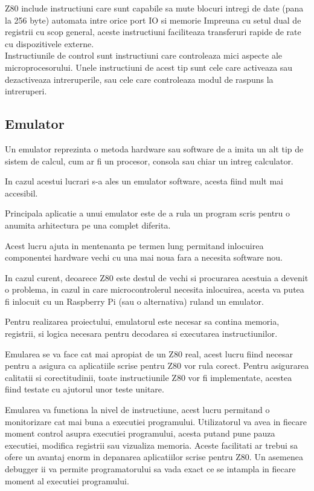 \documentclass[titlepage,12pt]{article}
\begin{document}
\ac {Z80} include instructiuni care sunt capabile sa mute blocuri intregi de date (pana la 256 byte) automata intre orice port \ac {IO} si memorie
Impreuna cu setul dual de registrii cu scop general, aceste instructiuni faciliteaza transferuri rapide de rate cu dispozitivele externe.\\

Instructiunile de control sunt instructiuni care controleaza mici aspecte ale microprocesorului.
Unele instructiuni de acest tip sunt cele care activeaza sau dezactiveaza intreruperile, sau cele care controleaza modul de raspuns la intreruperi.

\subsection{Emulator}
Un emulator reprezinta o metoda hardware sau software de a imita un alt tip de sistem de calcul, cum ar fi un procesor, consola sau chiar un intreg calculator.

In cazul acestui lucrari s-a ales un emulator software, acesta fiind mult mai accesibil.

Principala aplicatie a unui emulator este de a rula un program scris pentru o anumita arhitectura pe una complet diferita.

Acest lucru ajuta in mentenanta pe termen lung permitand inlocuirea componentei hardware vechi cu una mai noua fara a necesita software nou.

In cazul curent, deoarece \ac {Z80} este destul de vechi si procurarea acestuia a devenit o problema, in cazul in care microcontrolerul necesita inlocuirea, acesta va putea fi inlocuit cu un Raspberry Pi (sau o alternativa) ruland un emulator.

Pentru realizarea proiectului, emulatorul este necesar sa contina memoria, registrii, si logica necesara pentru decodarea si executarea instructiunilor.

Emularea se va face cat mai apropiat de un Z80 real, acest lucru fiind necesar pentru a asigura ca aplicatiile scrise pentru Z80 vor rula corect.
Pentru asigurarea calitatii si corectitudinii, toate instructiunile Z80 vor fi implementate, acestea fiind testate cu ajutorul unor teste unitare.

Emularea va functiona la nivel de instructiune, acest lucru permitand o monitorizare cat mai buna a executiei programului.
Utilizatorul va avea in fiecare moment control asupra executiei programului, acesta putand pune pauza executiei, modifica registrii sau vizualiza memoria.
Aceste facilitati ar trebui sa ofere un avantaj enorm in depanarea aplicatiilor scrise pentru Z80.
Un asemenea debugger ii va permite programatorului sa vada exact ce se intampla in fiecare moment al executiei programului.
\end{document}
